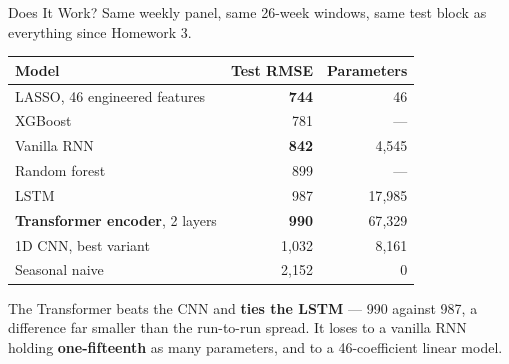 \documentclass[aspectratio=169, 11pt]{beamer}
\begin{document}
\begin{frame}{Does It Work?}
  Same weekly panel, same 26-week windows, same test block as everything since Homework 3.
  \begin{center}
    {\small
    \begin{tabular}{lrr}
      \toprule
      \textbf{Model} & \textbf{Test RMSE} & \textbf{Parameters} \\
      \midrule
      LASSO, 46 engineered features & \textbf{744} & 46 \\
      XGBoost & 781 & --- \\
      Vanilla RNN & \textbf{842} & 4{,}545 \\
      Random forest & 899 & --- \\
      LSTM & 987 & 17{,}985 \\
      \textbf{Transformer encoder}, 2 layers & \textbf{990} & 67{,}329 \\
      1D CNN, best variant & 1{,}032 & 8{,}161 \\
      Seasonal naive & 2{,}152 & 0 \\
      \bottomrule
    \end{tabular}
    }
  \end{center}

  \vspace{-0.05cm}
  The Transformer beats the CNN and \textbf{ties the LSTM} --- 990 against 987, a difference
  far smaller than the run-to-run spread. It loses to a vanilla RNN holding
  \textbf{one-fifteenth} as many parameters, and to a 46-coefficient linear model.
\end{frame}
\end{document}
